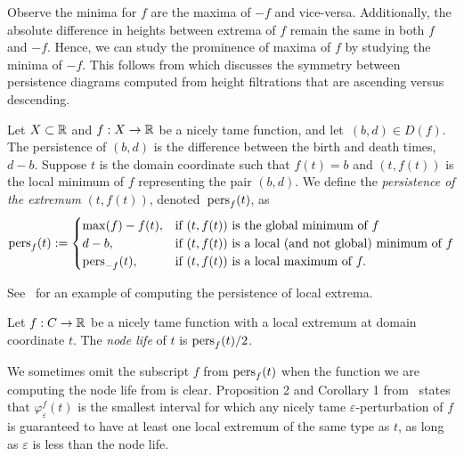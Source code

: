 Observe the minima for $f$ are the maxima of $-f$ and vice-versa. Additionally, the absolute difference in heights between extrema of $f$ remain the same in both $f$ and $-f$. Hence, we can study the prominence of maxima of $f$ by studying the minima of $-f$. This follows from \cite{BendichPersistent10} which discusses the symmetry between persistence diagrams computed from height filtrations that are ascending versus descending.

\begin{defn}
    Let $X \subset \mathbb{R}$ and $f:X\rightarrow \mathbb{R}$ be a nicely tame function, and
    let~$(b,d) \in D(f)$.  The persistence of $(b,d)$
    is the difference between the birth and death times,
    $d-b$. Suppose $t$ is the domain coordinate such that $f(t)=b$
    and $(t,f(t))$ is the local minimum of $f$ representing the pair $(b,d)$.
    We define the \emph{persistence of the extremum}  $(t,f(t))$,
    denoted~$\text{pers}_f(t)$, as
    \[ \text{pers}_f(t) :=
        \begin{cases}
            \max(f)-f(t), & \text{if } (t, f(t)) \text{ is the global minimum of } f\\
            d-b, & \text{if } (t, f(t)) \text{ is a local (and not global) minimum of } f\\
            \text{pers}_{-f}(t), & \text{if } (t, f(t)) \text{ is a local maximum of } f.\\
        \end{cases}
    \]
\end{defn}

See~ for an example of computing the persistence of local extrema.

\begin{defn}\label{def:nodelife}
    Let $f:C \rightarrow \mathbb{R}$ be a nicely tame function with a local extremum at domain coordinate $t$. The \emph{node life} of $t$ is $\text{pers}_f(t)/2$.
\end{defn}

We sometimes omit the subscript $f$ from $\text{pers}_f(t)$ when the function we are
computing the node life from is clear.
Proposition 2 and Corollary 1 from~\cite{BerryUsing20} states that $\varphi_\varepsilon^f(t)$ is
the smallest interval for which any nicely tame $\varepsilon$-perturbation of $f$ is guaranteed to have at least one local extremum of the same type as $t$, as long as $\varepsilon$ is less than the node life.

